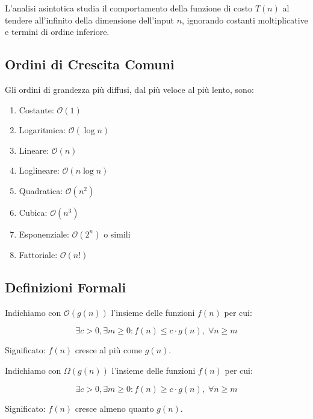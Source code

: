 \documentclass[12pt, a4paper]{article}
\begin{document}
L'analisi asintotica studia il comportamento della funzione di costo $T(n)$ al tendere all'infinito della dimensione dell'input $n$, ignorando costanti moltiplicative e termini di ordine inferiore.

\subsection{Ordini di Crescita Comuni}
Gli ordini di grandezza più diffusi, dal più veloce al più lento, sono:
\begin{enumerate}
\item Costante: $\mathcal{O}(1)$
\item Logaritmica: $\mathcal{O}(\log n)$
\item Lineare: $\mathcal{O}(n)$
\item Loglineare: $\mathcal{O}(n \log n)$
\item Quadratica: $\mathcal{O}(n^2)$
\item Cubica: $\mathcal{O}(n^3)$
\item Esponenziale: $\mathcal{O}(2^n)$ o simili
\item Fattoriale: $\mathcal{O}(n!)$
\end{enumerate}

\subsection{Definizioni Formali}

\begin{tcolorbox}[colback=lightergray!10, colframe=tocsec, title=\textbf{Notazione $\mathcal{O}$ (Big-O) - Limite Superiore}]
Indichiamo con $\mathcal{O}(g(n))$ l'insieme delle funzioni $f(n)$ per cui:


$$\exists c > 0, \exists m \ge 0 : f(n) \le c \cdot g(n),\; \forall n \ge m$$


Significato: $f(n)$ cresce al più come $g(n)$.
\end{tcolorbox}

\begin{tcolorbox}[colback=lightergray!10, colframe=tocsec, title=\textbf{Notazione $\Omega$ (Omega) - Limite Inferiore}]
Indichiamo con $\Omega(g(n))$ l'insieme delle funzioni $f(n)$ per cui:


$$\exists c > 0, \exists m \ge 0 : f(n) \ge c \cdot g(n),\; \forall n \ge m$$


Significato: $f(n)$ cresce almeno quanto $g(n)$.
\end{tcolorbox}
\end{document}
